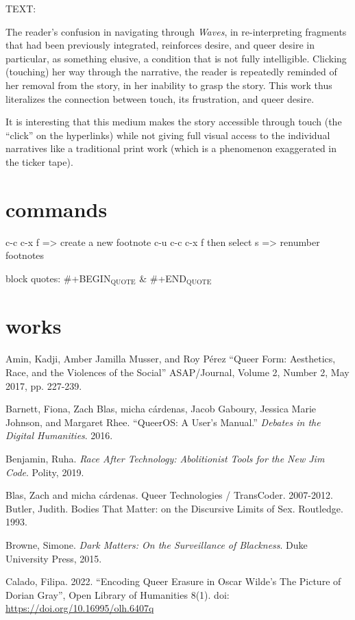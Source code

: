 \documentclass[11pt]{article}
\begin{document}
TEXT:

The reader’s confusion in navigating through \emph{Waves}, in
re-interpreting fragments that had been previously integrated,
reinforces desire, and queer desire in particular, as something
elusive, a condition that is not fully intelligible. Clicking
(touching) her way through the narrative, the reader is repeatedly
reminded of her removal from the story, in her inability to grasp the
story. This work thus literalizes the connection between touch, its
frustration, and queer desire.

It is interesting that this medium makes the story accessible through
touch (the “click” on the hyperlinks) while not giving full visual
access to the individual narratives like a traditional print work
(which is a phenomenon exaggerated in the ticker tape). 

\section{commands}
\label{sec:org2a37f86}
c-c c-x f => create a new footnote
c-u c-c c-x f then select s => renumber footnotes

block quotes: \#+BEGIN\(_{\text{QUOTE}}\) \& \#+END\(_{\text{QUOTE}}\)

\section{works}
\label{sec:org5e08907}

Amin, Kadji, Amber Jamilla Musser, and Roy Pérez “Queer Form:
Aesthetics, Race, and the Violences of the Social” ASAP/Journal,
Volume 2, Number 2, May 2017, pp. 227-239.

Barnett, Fiona, Zach Blas, micha cárdenas, Jacob Gaboury, Jessica
Marie Johnson, and Margaret Rhee. “QueerOS: A User’s Manual.” \emph{Debates
in the Digital Humanities}. 2016.

Benjamin, Ruha. \emph{Race After Technology: Abolitionist Tools for the New
Jim Code}. Polity, 2019.

Blas, Zach and micha cárdenas. Queer Technologies / TransCoder.
2007-2012.  Butler, Judith. Bodies That Matter: on the Discursive
Limits of Sex. Routledge. 1993.

Browne, Simone. \emph{Dark Matters: On the Surveillance of Blackness}. Duke
University Press, 2015.

Calado, Filipa. 2022. “Encoding Queer Erasure in Oscar Wilde’s The
Picture of Dorian Gray”, Open Library of Humanities 8(1). doi:
\url{https://doi.org/10.16995/olh.6407q}
\end{document}
